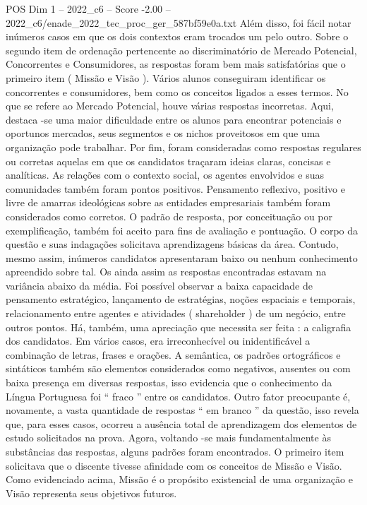 \begin{textsample}{POS Dim 1 – 2022\_c6 – Score -2.00 – 2022\_c6/enade\_2022\_tec\_proc\_ger\_587bf59e0a.txt}
Além disso, foi fácil notar inúmeros casos em que os dois contextos eram trocados um pelo outro.
Sobre o segundo item de ordenação pertencente ao discriminatório de Mercado Potencial, Concorrentes e Consumidores, as respostas foram bem mais satisfatórias que o primeiro item ( Missão e Visão ).
Vários alunos conseguiram identificar os concorrentes e consumidores, bem como os conceitos ligados a esses termos.
No que se refere ao Mercado Potencial, houve várias respostas incorretas.
Aqui, destaca -se uma maior dificuldade entre os alunos para encontrar potenciais e oportunos mercados, seus segmentos e os nichos proveitosos em que uma organização pode trabalhar.
Por fim, foram consideradas como respostas regulares ou corretas aquelas em que os candidatos traçaram ideias claras, concisas e analíticas.
As relações com o contexto social, os agentes envolvidos e suas comunidades também foram pontos positivos.
Pensamento reflexivo, positivo e livre de amarras ideológicas sobre as entidades empresariais também foram considerados como corretos.
O padrão de resposta, por conceituação ou por exemplificação, também foi aceito para fins de avaliação e pontuação.
O corpo da questão e suas indagações solicitava aprendizagens básicas da área.
Contudo, mesmo assim, inúmeros candidatos apresentaram baixo ou nenhum conhecimento apreendido sobre tal.
Os ainda assim as respostas encontradas estavam na variância abaixo da média.
Foi possível observar a baixa capacidade de pensamento estratégico, lançamento de estratégias, noções espaciais e temporais, relacionamento entre agentes e atividades ( shareholder ) de um negócio, entre outros pontos.
Há, também, uma apreciação que necessita ser feita : a caligrafia dos candidatos.
Em vários casos, era irreconhecível ou inidentificável a combinação de letras, frases e orações.
A semântica, os padrões ortográficos e sintáticos também são elementos considerados como negativos, ausentes ou com baixa presença em diversas respostas, isso evidencia que o conhecimento da Língua Portuguesa foi “ fraco ” entre os candidatos.
Outro fator preocupante é, novamente, a vasta quantidade de respostas “ em branco ” da questão, isso revela que, para esses casos, ocorreu a ausência total de aprendizagem dos elementos de estudo solicitados na prova.
Agora, voltando -se mais fundamentalmente às substâncias das respostas, alguns padrões foram encontrados.
O primeiro item solicitava que o discente tivesse afinidade com os conceitos de Missão e Visão.
Como evidenciado acima, Missão é o propósito existencial de uma organização e Visão representa seus objetivos futuros.

\end{textsample}
